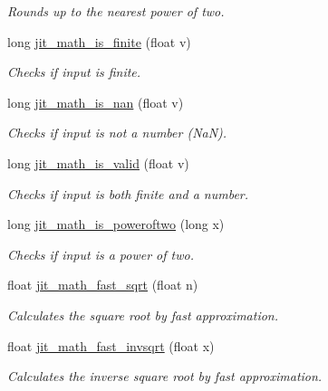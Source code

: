 \begin{DoxyCompactItemize}
\begin{DoxyCompactList}\small\item\em Rounds up to the nearest power of two. \item\end{DoxyCompactList}\item 
long \hyperlink{group__mathmod_gaed663cf800c154ac4aa648f445433117}{jit\_\-math\_\-is\_\-finite} (float v)
\begin{DoxyCompactList}\small\item\em Checks if input is finite. \item\end{DoxyCompactList}\item 
long \hyperlink{group__mathmod_ga3c3b5e73ae2793198e67053e4569421b}{jit\_\-math\_\-is\_\-nan} (float v)
\begin{DoxyCompactList}\small\item\em Checks if input is not a number (NaN). \item\end{DoxyCompactList}\item 
long \hyperlink{group__mathmod_ga1946e8fd8d835c84668fcd24ab1cf518}{jit\_\-math\_\-is\_\-valid} (float v)
\begin{DoxyCompactList}\small\item\em Checks if input is both finite and a number. \item\end{DoxyCompactList}\item 
long \hyperlink{group__mathmod_ga663f468e3ac91ed951580471e44c9538}{jit\_\-math\_\-is\_\-poweroftwo} (long x)
\begin{DoxyCompactList}\small\item\em Checks if input is a power of two. \item\end{DoxyCompactList}\item 
float \hyperlink{group__mathmod_ga037a0ddcef293492e1c683d70bd59890}{jit\_\-math\_\-fast\_\-sqrt} (float n)
\begin{DoxyCompactList}\small\item\em Calculates the square root by fast approximation. \item\end{DoxyCompactList}\item 
float \hyperlink{group__mathmod_gacbb43344ff2124157aa024dd4e2acc68}{jit\_\-math\_\-fast\_\-invsqrt} (float x)
\begin{DoxyCompactList}\small\item\em Calculates the inverse square root by fast approximation. \item\end{DoxyCompactList}\item 

\end{DoxyCompactItemize}
